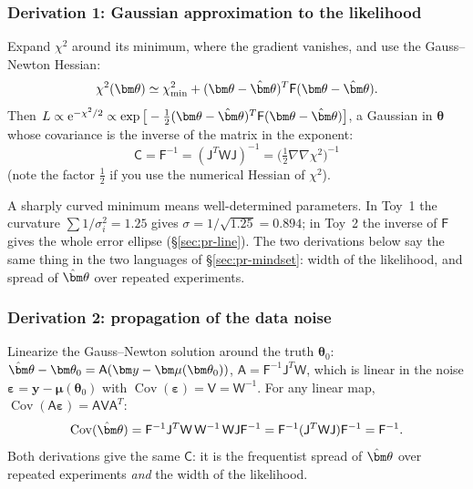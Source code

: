 \documentclass[11pt,a4paper]{article}
\numberwithin{equation}{section}
\theoremstyle{definition}
\theoremstyle{plain}
\theoremstyle{remark}
\newenvironment{plainwords}[1][In plain words]{\begin{tcolorbox}[plainbox,title={\small\bfseries #1},fonttitle=\small,coltitle=white,colbacktitle=ForestGreen!60!black]}{\end{tcolorbox}}
\numberwithin{algorithm}{section}
\newcommand{\ee}{\mathrm{e}}
\newcommand{\sA}{\mathsf A}
\newcommand{\sJ}{\mathsf J}
\newcommand{\sW}{\mathsf W}
\newcommand{\sV}{\mathsf V}
\newcommand{\sF}{\mathsf F}
\newcommand{\sC}{\mathsf C}
\newcommand{\vth}{\bm\theta}
\begin{document}
\subsubsection{Derivation 1: Gaussian approximation to the likelihood}
Expand $\chi^2$ around its minimum, where the gradient vanishes, and use the Gauss--Newton Hessian:
\begin{equation}
\chi^2(\vth)\simeq\chi^2_{\min}+(\vth-\hat\vth)^T\sF(\vth-\hat\vth).
\end{equation}
Then $L\propto\ee^{-\chi^2/2}\propto\exp\big[-\frac12(\vth-\hat\vth)^T\sF(\vth-\hat\vth)\big]$, a Gaussian in $\vth$ whose covariance is the inverse of the matrix in the exponent:
\begin{equation}
\boxed{\ \sC=\sF^{-1}=(\sJ^T\sW\sJ)^{-1}=\Big(\tfrac12\nabla\nabla\chi^2\Big)^{-1}\ }
\label{eq:cov}
\end{equation}
(note the factor $\frac12$ if you use the numerical Hessian of $\chi^2$).
\begin{plainwords}[In plain words]
A sharply curved minimum means well-determined parameters. In Toy~1 the curvature $\sum1/\sigma_i^2=1.25$ gives $\sigma=1/\sqrt{1.25}=0.894$; in Toy~2 the inverse of $\sF$ gives the whole error ellipse (\S\ref{sec:pr-line}). The two derivations below say the same thing in the two languages of \S\ref{sec:pr-mindset}: width of the likelihood, and spread of $\hat\vth$ over repeated experiments.
\end{plainwords}

\subsubsection{Derivation 2: propagation of the data noise}
Linearize the Gauss--Newton solution around the truth $\vth_0$: $\hat\vth-\vth_0=\sA(\bm y-\bm\mu(\vth_0))$, $\sA=\sF^{-1}\sJ^T\sW$, which is linear in the noise $\bm\varepsilon=\bm y-\bm\mu(\vth_0)$ with $\operatorname{Cov}(\bm\varepsilon)=\sV=\sW^{-1}$. For any linear map, $\operatorname{Cov}(\sA\bm\varepsilon)=\sA\sV\sA^T$:
\[
\operatorname{Cov}(\hat\vth)=\sF^{-1}\sJ^T\sW\,\sW^{-1}\,\sW\sJ\sF^{-1}=\sF^{-1}(\sJ^T\sW\sJ)\sF^{-1}=\sF^{-1}.
\]
Both derivations give the same $\sC$: it is the frequentist spread of $\hat\vth$ over repeated experiments \emph{and} the width of the likelihood.
\end{document}
